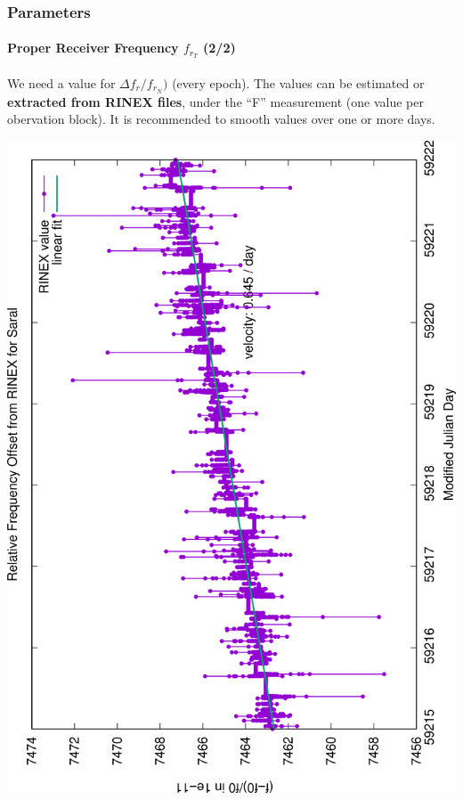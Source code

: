 \documentclass{beamer}
\begin{document}
\begin{frame}\frametitle{Parameters}\framesubtitle{Proper Receiver Frequency \(f_{r_T}\) (2/2)}
  We need a value for  \(\Delta f_r / f_{r_N})\) (every epoch). The values can be 
  estimated or \textbf{extracted from RINEX files}, under the ``F'' measurement (one value 
  per obervation block). It is recommended to smooth values over one or more days.

  \begin{center}
    \includegraphics[scale=.3, angle=-90]{Saral-RinexRfo}
  \end{center}
\end{frame}
\end{document}
